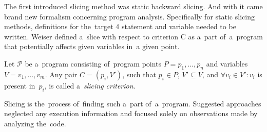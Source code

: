 The first introduced slicing method was static backward slicing.
And with it came brand new formalism concerning program analysis. 
Specifically for static slicing methods, definitions for the~target 4
statement and variable needed to be written.
Weiser \citep{Weiser84}
defined a~slice with respect to criterion C 
as a~part of~a~program that potentially affects given variables in~a given point. 

\begin{defn}\label{def02:5}
  Let $\mathcal{P}$ be a~program consisting of~program points 
  $P = p_1,\dots,p_n$ and variables $V = v_1,\dots,v_m$.
  Any pair $C = (p_i, V')$, such that $p_i \in P$, $V' \subseteq V$, and 
  $\forall v_i \in V': v_i$ is present in~$p_i$, 
  is called a~\emph{slicing criterion}.
\end{defn}

Slicing is the~process of~finding such a~part of~a~program. 
Suggested approaches neglected any execution information and 
focused solely on observations made by analyzing the~code.


